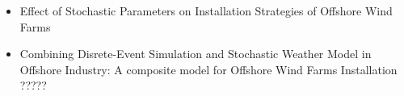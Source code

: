 \begin{titles}
\begin{itemize}
\item Effect of Stochastic Parameters on Installation Strategies of Offshore Wind Farms
\item Combining Disrete-Event Simulation and Stochastic Weather Model in Offshore Industry: A composite model for Offshore Wind Farms Installation
\tiem ?????
\end{itemize}
\end{titles}